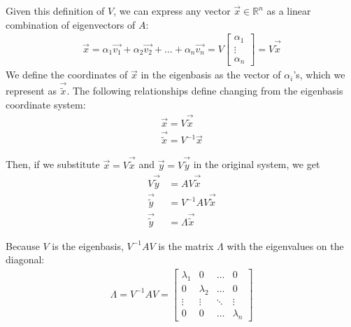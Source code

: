 Given this definition of $V$, we can express any vector $\vec{x} \in \mathbb{R}^n$ as a linear combination of eigenvectors of $A$:
\begin{align*}
    \vec{x} = \alpha_1 \vec{v_1} + \alpha_2 \vec{v_2} + \dots + \alpha_n \vec{v_n} = V \begin{bmatrix} \alpha_1 \\ \vdots \\ \alpha_n \end{bmatrix} = V \vec{\widetilde{x}}
\end{align*}
We define the coordinates of $\vec{x}$ in the eigenbasis as the vector of $\alpha_i$'s, which we represent as $\vec{\widetilde{x}}$. The following relationships define changing from the eigenbasis coordinate system:
\begin{align*}
    \vec{x} = V \vec{\widetilde{x}} \\
    \vec{\widetilde{x}} = V^{-1} \vec{x}
\end{align*}

Then, if we substitute $\vec{x} = V \vec{\widetilde{x}}$ and $\vec{y} = V \vec{\widetilde{y}}$ in the original system, we get
\begin{align*}
    V \vec{\widetilde{y}} &= AV \vec{\widetilde{x}} \\
    \vec{\widetilde{y}} &= V^{-1}AV \vec{\widetilde{x}} \\
    \vec{\widetilde{y}} &= \Lambda \vec{\widetilde{x}}
\end{align*}

Because $V$ is the eigenbasis, $V^{-1}AV$ is the matrix $\Lambda$ with the eigenvalues on the diagonal:
\begin{align*}
    \boxed{\Lambda = V^{-1}AV} = 
    \begin{bmatrix}
        \lambda_1 & 0 & \dots & 0 \\
        0 & \lambda_2 & \dots & 0 \\
        \vdots & \vdots & \ddots & \vdots \\
        0 & 0 & \dots & \lambda_n
    \end{bmatrix}
\end{align*}


